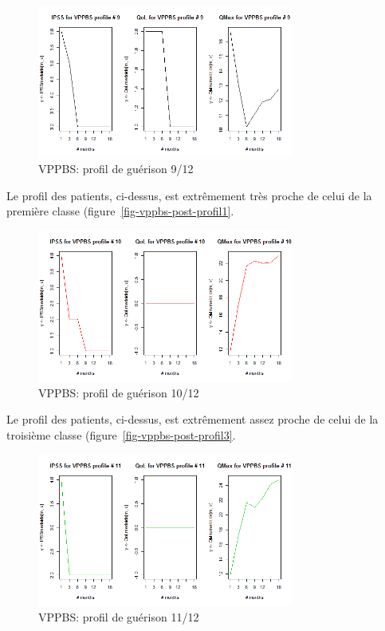 \begin{figure}[H]
\centering
\includegraphics[width=0.75\textwidth]{../Fig/VPPBS/vppbs-profil-post-09.png}
\caption[]{VPPBS: profil de guérison 9/12}
\label{fig-vppbs-post-profil9}
\end{figure}

Le profil des patients, ci-dessus, est extrêmement très proche de celui de la première classe (figure~\ref{fig-vppbs-post-profil1}.

\begin{figure}[H]
\centering
\includegraphics[width=0.75\textwidth]{../Fig/VPPBS/vppbs-profil-post-10.png}
\caption[]{VPPBS: profil de guérison 10/12}
\label{fig-vppbs-post-profil10}
\end{figure}

Le profil des patients, ci-dessus, est extrêmement assez proche de celui de la troisième classe (figure~\ref{fig-vppbs-post-profil3}.

\begin{figure}[H]
\centering
\includegraphics[width=0.75\textwidth]{../Fig/VPPBS/vppbs-profil-post-11.png}
\caption[]{VPPBS: profil de guérison 11/12}
\label{fig-vppbs-post-profil11}
\end{figure}

